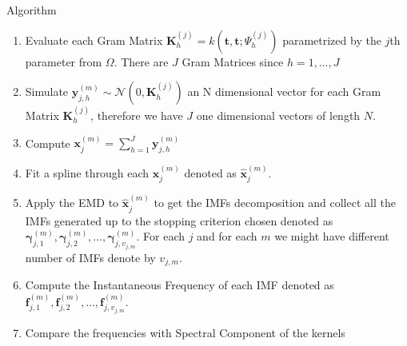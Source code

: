 \documentclass[11pt, a4paper]{article} %
\begin{document}
\begin{algorithm}[H]


\label{algo_exp1}
\caption{Algorithm}

\BlankLine
\addtolength\linewidth{-12ex}


\begin{enumerate}

\item Evaluate each Gram Matrix $\mathbf{K}^{(j)}_h = k(\mathbf{t},\mathbf{t}; \Psi^{(j)}_h)$ parametrized by the $j$th parameter from $\Omega$. There are $J$ Gram Matrices since $h = 1, \dots, J$ \\

\item Simulate $\mathbf{y}_{j,h}^{(m)} \sim \mathcal{N}(0, \mathbf{K}^{(j)}_h)$ an N dimensional vector for each Gram Matrix $\mathbf{K}^{(j)}_h$, therefore we have $J$ one dimensional vectors of length $N$.\\

\item Compute $ \mathbf{x}^{(m)}_j = \sum_{h=1}^{J} \mathbf{y}_{j,h}^{(m)} $

\item Fit a spline through each $\mathbf{x}_j^{(m)}$ denoted as $\hat{\mathbf{x}}_j^{(m)}$.

\item Apply the EMD to $ \hat{\mathbf{x}}_j^{(m)}$ to get the IMFs decomposition and collect all the IMFs generated up to the stopping criterion chosen denoted as $\bm{\gamma}^{(m)}_{j,1}, \bm{\gamma}_{j,2}^{(m)}, \dots, \bm{\gamma}_{j,v_{j,m}}^{(m)}$. For each $j$ and for each $m$ we might have different number of IMFs denote by $v_{j,m}$.

\item Compute the Instantaneous Frequency of each IMF denoted as $\bm{f}^{(m)}_{j,1}, \bm{f}_{j,2}^{(m)}, \dots, \bm{f}_{j,v_{j,m}}^{(m)}$.
\item Compare the frequencies with Spectral Component of the kernels


\end{enumerate}

\end{algorithm}


\hfill

\newpage
\end{document}
